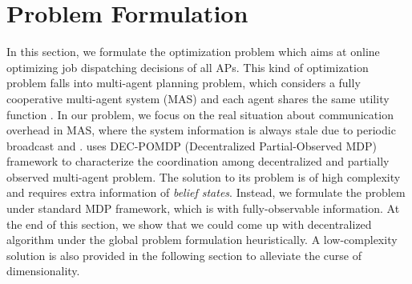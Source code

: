 \section{Problem Formulation}
In this section, we formulate the optimization problem which aims at online optimizing job dispatching decisions of all APs.
This kind of optimization problem falls into multi-agent planning problem, which considers a fully cooperative multi-agent system (MAS) and each agent shares the same utility function .
In our problem, we focus on the real situation about communication overhead in MAS, where the system information is always stale due to periodic broadcast and \brdelay.
 uses DEC-POMDP (Decentralized Partial-Observed MDP) framework to characterize the coordination among decentralized and partially observed multi-agent problem. The solution to its problem is of high complexity and requires extra information of \emph{belief states}.
Instead, we formulate the problem under standard MDP framework, which is with fully-observable information.
At the end of this section, we show that we could come up with decentralized algorithm under the global problem formulation heuristically. A low-complexity solution is also provided in the following section to alleviate the curse of dimensionality.

